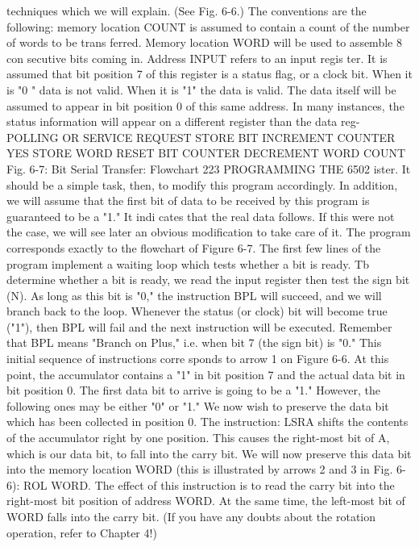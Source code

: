 techniques which we will explain. (See Fig. 6-6.)
The conventions are the following: memory location COUNT is
assumed to contain a count of the number of words to be trans
ferred. Memory location WORD will be used to assemble 8 con
secutive bits coming in. Address INPUT refers to an input regis
ter. It is assumed that bit position 7 of this register is a status flag,
or a clock bit. When it is "0 " data is not valid. When it is "1" the
data is valid. The data itself will be assumed to appear in bit
position 0 of this same address. In many instances, the status
information will appear on a different register than the data reg-
POLLING OR SERVICE REQUEST
STORE BIT
INCREMENT COUNTER
YES
STORE WORD
RESET BIT COUNTER
DECREMENT WORD COUNT
Fig. 6-7: Bit Serial Transfer: Flowchart
223
PROGRAMMING THE 6502
ister. It should be a simple task, then, to modify this program
accordingly. In addition, we will assume that the first bit of data
to be received by this program is guaranteed to be a "1." It indi
cates that the real data follows. If this were not the case, we will
see later an obvious modification to take care of it. The program
corresponds exactly to the flowchart of Figure 6-7. The first few
lines of the program implement a waiting loop which tests
whether a bit is ready. Tb determine whether a bit is ready, we
read the input register then test the sign bit (N). As long as this
bit is "0," the instruction BPL will succeed, and we will branch
back to the loop. Whenever the status (or clock) bit will become
true ("1"), then BPL will fail and the next instruction will be
executed.
Remember that BPL means "Branch on Plus," i.e. when bit 7
(the sign bit) is "0." This initial sequence of instructions corre
sponds to arrow 1 on Figure 6-6.
At this point, the accumulator contains a "1" in bit position 7
and the actual data bit in bit position 0. The first data bit to arrive
is going to be a "1." However, the following ones may be either "0"
or "1." We now wish to preserve the data bit which has been
collected in position 0. The instruction:
LSRA
shifts the contents of the accumulator right by one position. This
causes the right-most bit of A, which is our data bit, to fall into
the carry bit. We will now preserve this data bit into the memory
location WORD (this is illustrated by arrows 2 and 3 in Fig. 6-6):
ROL WORD.
The effect of this instruction is to read the carry bit into the
right-most bit position of address WORD. At the same time, the
left-most bit of WORD falls into the carry bit. (If you have any
doubts about the rotation operation, refer to Chapter 4!)

